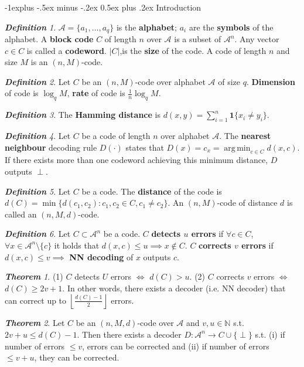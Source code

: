 \documentclass[frenchspacing,9pt,landscape,a4paper]{article}
\makeatletter
\renewcommand{\subsection}{\@startsection{subsection}{2}{0mm}%
                                {-1explus -.5ex minus -.2ex}%
                                {0.5ex plus .2ex}%
                                {\normalfont\normalsize\bfseries}}
\newcommand{\BN}{\mathbb N}
\newcommand{\mb}[1]{\mathbf {#1}}
\newcommand{\tb}[1]{\textbf {#1}}
\newcommand{\floor}[1]{\left\lfloor #1 \right\rfloor}
\DeclareMathOperator*{\argmin}{arg\,min}
\theoremstyle{remark}
\newtheorem*{thm}{\textbf{Theorem}}
\newtheorem*{defn}{\textbf{Definition}}
\makeatother
\begin{document}
\begin{multicols}{4}
\subsection{Introduction}
\begin{defn}
    $\mathcal{A} = \{a_1, \ldots, a_q\}$ is the \textbf{alphabet}; $a_i$ are the \textbf{symbols} of the
    alphabet. A \textbf{block code} $C$ of length $n$ over $\mathcal{A}$ is a subset of $\mathcal{A}^n$.
    Any vector $c \in C$ is called a \textbf{codeword}. $|C|$,is the \textbf{size} of the code. A code of
    length $n$ and size $M$ is an $(n, M)$-code.
\end{defn}
\begin{defn}
    Let $C$ be an  $(n,M)$-code over alphabet  $\mathcal{A}$ of size  $q$. \textbf{Dimension} of code is  $\log_q
    M$, \textbf{rate} of code is  $\frac{1}{n}\log_q M$.
\end{defn}
\begin{defn}
    The \textbf{Hamming distance} is $d(x,y)=\sum_{i=1}^n\mb{1}\{x_i\neq y_i\}$.
\end{defn}
\begin{defn}
    Let $C$ be a code of length  $n$ over alphabet  $\mathcal{A}$. The \tb{nearest neighbour} decoding rule
    $D(\cdot)$ states that $D(x)=c_x=\argmin_{c\in C} d(x,c)$. If there exists more than one codeword
    achieving this minimum distance,  $D$ outputs  $\perp$.
\end{defn}
\begin{defn}
    Let $C$ be a code. The \tb{distance} of the code is $d(C)=\min\{d(c_1,c_2):c_1,c_2\in C,c_1\neq c_2\}$.
    An $(n,M)$-code of distance  $d$ is called an  $(n,M,d)$-code.
\end{defn}
\begin{defn}
    Let $C\subset\mathcal{A}^n$ be a code.  $C$ \tb{detects  $u$ errors} if  $\forall c\in C$,  $\forall
    x\in\mathcal{A}^n\setminus\{c\}$ it holds that  $d(x,c)\leq u\implies x\notin C$.  $C$ \tb{corrects
    $v$ errors}  if $d(x,c)\leq v\implies$ \tb{NN decoding} of $x$ outputs $c$.
\end{defn}
\begin{thm}
    (1) $C$ detects  $U$ errors  $\iff$  $d(C)>u$. (2)  $C$ corrects  $v$ errors  $\iff$  $d(C)\geq 2v+1$. 
    In other words, there exists a decoder (i.e. NN decoder) that can correct up to
    $\floor{\frac{d(C)-1}{2}}$ errors.
\end{thm}
\begin{thm}
    Let $C$ be an  $(n,M,d)$-code over  $\mathcal{A}$ and $v,u\in\BN$ s.t.  $2v+u\leq d(C)-1$. Then there
    exists a decoder  $D:\mathcal{A}^n\to C\cup\{\perp\}$ s.t. (i) if number of errors $\leq v$, errors can
    be corrected and (ii) if number of errors  $\leq v+u$, they can be corrected.
\end{thm}

\end{multicols}
\end{document}
